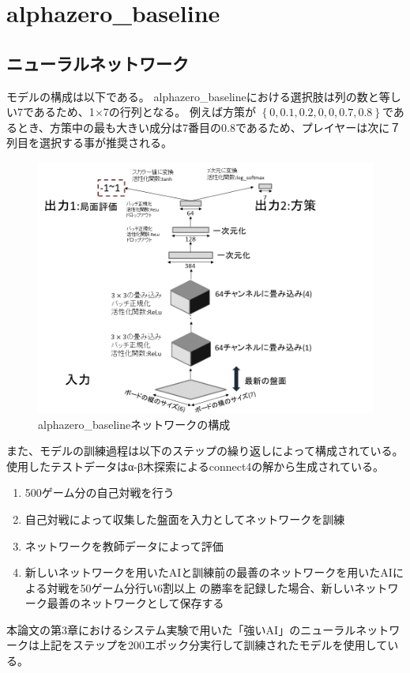 \chapter{alphazero\_baseline}
\section{ニューラルネットワーク}
モデルの構成は以下である。
alphazero\_baselineにおける選択肢は列の数と等しい7であるため、1$\times$7の行列となる。
例えば方策が
$\left\{0, 0.1, 0.2, 0, 0, 0.7, 0.8\right\}$であるとき、方策中の最も大きい成分は7番目の0.8であるため、プレイヤーは次に７列目を選択する事が推奨される。
\begin{figure}[t]
	\centering
	\includegraphics[width=\linewidth]{./figure/baselineNetwork.png}
	\caption{alphazero\_baselineネットワークの構成}
	\label{fig:baselineNetwork}
\end{figure}
また、モデルの訓練過程は以下のステップの繰り返しによって構成されている。
使用したテストデータ\cite{dataset}はα-β木探索によるconnect4の解から生成されている\cite{scoring}。
\begin{enumerate}
	\item 500ゲーム分の自己対戦を行う
	\item 自己対戦によって収集した盤面を入力としてネットワークを訓練
    \item ネットワークを教師データによって評価
    \item 新しいネットワークを用いたAIと訓練前の最善のネットワークを用いたAIによる対戦を50ゲーム分行い6割以上
    の勝率を記録した場合、新しいネットワーク最善のネットワークとして保存する

\end{enumerate}
本論文の第3章におけるシステム実験で用いた「強いAI」のニューラルネットワークは上記をステップを200エポック分実行して訓練されたモデルを使用している。

